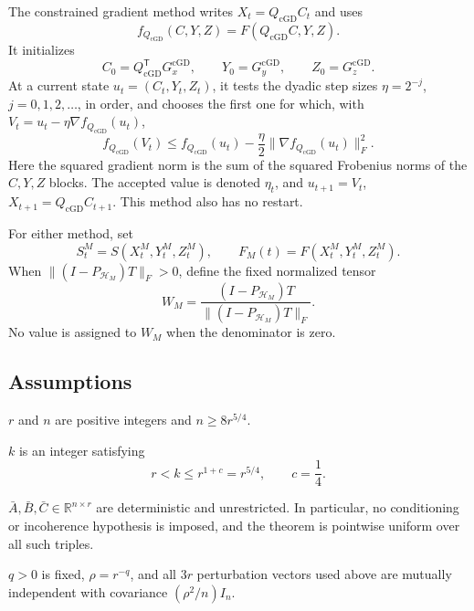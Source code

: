 The constrained gradient method writes $X_t=Q_{\mathrm{cGD}}C_t$ and uses
\[
 f_{Q_{\mathrm{cGD}}}(C,Y,Z)=F(Q_{\mathrm{cGD}}C,Y,Z).
\]
It initializes
\[
 C_0=Q_{\mathrm{cGD}}^{\mathsf T}G_x^{\mathrm{cGD}},
 \qquad Y_0=G_y^{\mathrm{cGD}},
 \qquad Z_0=G_z^{\mathrm{cGD}}.
\]
At a current state $u_t=(C_t,Y_t,Z_t)$, it tests the dyadic step sizes
$\eta=2^{-j}$, $j=0,1,2,\ldots$, in order, and chooses the first one for
which, with $V_t=u_t-\eta\nabla f_{Q_{\mathrm{cGD}}}(u_t)$,
\[
 f_{Q_{\mathrm{cGD}}}(V_t)
 \le f_{Q_{\mathrm{cGD}}}(u_t)
 -\frac{\eta}{2}\|\nabla f_{Q_{\mathrm{cGD}}}(u_t)\|_F^2.
\]
Here the squared gradient norm is the sum of the squared Frobenius norms of
the $C,Y,Z$ blocks.  The accepted value is denoted $\eta_t$, and
$u_{t+1}=V_t$, $X_{t+1}=Q_{\mathrm{cGD}}C_{t+1}$.  This method also has no
restart.

For either method, set
\[
 S_t^M=S(X_t^M,Y_t^M,Z_t^M),
 \qquad
 F_M(t)=F(X_t^M,Y_t^M,Z_t^M).
\]
When $\|(I-P_{\mathcal H_M})T\|_F>0$, define the fixed normalized tensor
\[
 W_M=\frac{(I-P_{\mathcal H_M})T}
 {\|(I-P_{\mathcal H_M})T\|_F}.
\]
No value is assigned to $W_M$ when the denominator is zero.

\subsection{Assumptions}

\begin{assumption}\label{assump:dimension}
$r$ and $n$ are positive integers and $n\ge 8r^{5/4}$.
\end{assumption}

\begin{assumption}\label{assump:rank_window}
$k$ is an integer satisfying
\[
 r<k\le r^{1+c}=r^{5/4},
 \qquad c=\frac14.
\]
\end{assumption}

\begin{assumption}\label{assump:arbitrary_base}
$\bar A,\bar B,\bar C\in\mathbb R^{n\times r}$ are deterministic and
unrestricted.  In particular, no conditioning or incoherence hypothesis is
imposed, and the theorem is pointwise uniform over all such triples.
\end{assumption}

\begin{assumption}\label{assump:gaussian_smoothing}
$q>0$ is fixed, $\rho=r^{-q}$, and all $3r$ perturbation vectors used above
are mutually independent with covariance $(\rho^2/n)I_n$.
\end{assumption}

